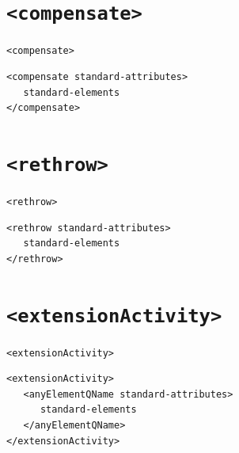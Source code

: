 \section{\texttt{<compensate>}}

\texttt{<compensate>}
\begin{verbatim}
<compensate standard-attributes>
   standard-elements
</compensate>
\end{verbatim}

\section{\texttt{<rethrow>}}

\texttt{<rethrow>}
\begin{verbatim}
<rethrow standard-attributes>
   standard-elements
</rethrow>
\end{verbatim}

\section{\texttt{<extensionActivity>}}

\texttt{<extensionActivity>}
\begin{verbatim}
<extensionActivity>
   <anyElementQName standard-attributes>
      standard-elements
   </anyElementQName>
</extensionActivity>
\end{verbatim}
